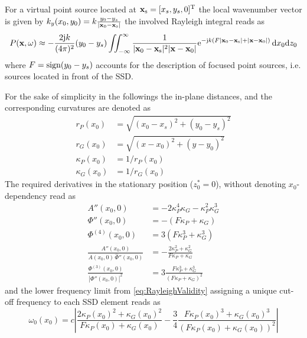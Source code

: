 \documentclass[11pt]{article}
\begin{document}
For a virtual point source located at $\mathbf{x}_{\mathrm{s}} = [x_s,y_s, 0]^{\mathrm{T}}$ the local wavenumber vector is given by $k_y(x_0,y_0) = k\frac{y_0-y_s}{|\mathbf{x}_0-\mathbf{x}_{\mathrm{s}}|}$ the involved Rayleigh integral reads as
\begin{equation}
    \small
    P(\mathbf{x},\omega) \approx -\frac{2 \mathrm{j} k}{(4 \pi)^2} (y_0-y_s)\iint_{-\infty}^{\infty} \frac{1}{|\mathbf{x}_0-\mathbf{x}_{\mathrm{s}}|^2 |\mathbf{x}-\mathbf{x}_0|} \mathrm{e}^{-\mathrm{j} k \left(F |\mathbf{x}_0-\mathbf{x}_{\mathrm{s}}| + |\mathbf{x}-\mathbf{x}_0| \right)}  \, \mathrm{d} x_0 \mathrm{d} z_0
\end{equation}
where $F = \text{sign}(y_0-y_s)$ accounts for the description of focused point sources, i.e. sources located in front of the SSD.

For the sake of simplicity in the followings the in-plane distances, and the corresponding curvatures are denoted as
\begin{align}
r_P(x_0) &= \sqrt{(x_0 - x_s)^2 +(y_0 - y_s)^2 }\\  
r_G(x_0) &= \sqrt{(x - x_0)^2 +(y - y_0)^2 } \\
\kappa_P(x_0) &= 1/r_P(x_0) \\
\kappa_G(x_0) &= 1/r_G(x_0) 
\end{align}
The required derivatives in the stationary position ($z_0^* = 0$), without denoting $x_0$-dependency read as
\begin{align}
    A''(x_0,0) &=  - 2\kappa_P^4\kappa_G - \kappa_P^2 \kappa_G^3 \\  
    \Phi''(x_0,0) &=  - \left( F \kappa_P + \kappa_G \right)\\
    \Phi^{(4)}(x_0,0) &= 3 (    F\kappa_P^3 + \kappa_G^3) \\
    \frac{A''(x_0,0)}{A(x_0,0) \, \hat{\Phi}''(x_0,0) } &= - \frac{2 \kappa_P^2 + \kappa_G^2}{F\kappa_P + \kappa_G} \\
    \frac{\Phi^{(3)}(x_0,0)}{|\Phi''(x_0,0)|^2 } &= 3\frac{F \kappa_P^3 + \kappa_G^3}{(F\kappa_P + \kappa_G)^2}
\end{align}
and the lower frequency limit from \eqref{eq:RayleighValidity} assigning a unique cut-off frequency to each SSD element reads as
\begin{equation}
    \omega_0(x_0) = c \left| \frac{2 \kappa_P(x_0)^2 + \kappa_G(x_0)^2}{F\kappa_P(x_0) + \kappa_G(x_0)}
    -
    \frac{3}{4}
    \frac{F \kappa_P(x_0)^3 + \kappa_G(x_0)^3}{(F\kappa_P(x_0) + \kappa_G(x_0))^2}\right| 
        \label{eq:PScutoff}
\end{equation}
\end{document}
